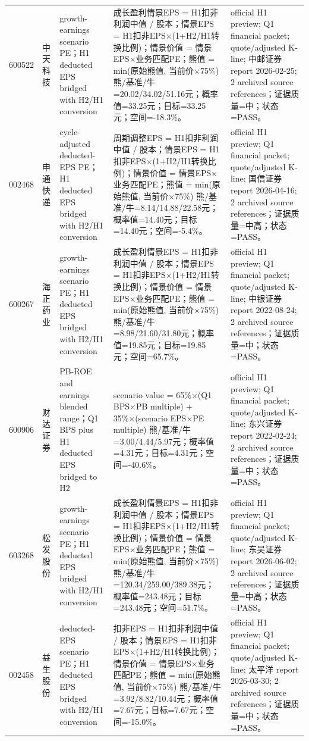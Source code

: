 \begin{longtable}{L{0.85cm}L{1.55cm}L{2.25cm}L{6.0cm}L{4.0cm}}
600522 & 中天科技 & growth-earnings scenario PE；H1 deducted EPS bridged with H2/H1 conversion & 成长盈利情景EPS = H1扣非利润中值 / 股本；情景EPS = H1扣非EPS×(1+H2/H1转换比例)；情景价值 = 情景EPS×业务匹配PE；熊值 = min(原始熊值, 当前价×75\%) 熊/基准/牛=20.02/34.02/51.16元；概率值=33.25元；目标=33.25元；空间=-18.3\%。 & official H1 preview; Q1 financial packet; quote/adjusted K-line; 中邮证券 report 2026-02-25; 2 archived source references；证据质量=中；状态=PASS。 \\
002468 & 申通快递 & cycle-adjusted deducted-EPS PE；H1 deducted EPS bridged with H2/H1 conversion & 周期调整EPS = H1扣非利润中值 / 股本；情景EPS = H1扣非EPS×(1+H2/H1转换比例)；情景价值 = 情景EPS×业务匹配PE；熊值 = min(原始熊值, 当前价×75\%) 熊/基准/牛=8.14/14.88/22.58元；概率值=14.40元；目标=14.40元；空间=-5.4\%。 & official H1 preview; Q1 financial packet; quote/adjusted K-line; 国信证券 report 2026-04-16; 2 archived source references；证据质量=中高；状态=PASS。 \\
600267 & 海正药业 & growth-earnings scenario PE；H1 deducted EPS bridged with H2/H1 conversion & 成长盈利情景EPS = H1扣非利润中值 / 股本；情景EPS = H1扣非EPS×(1+H2/H1转换比例)；情景价值 = 情景EPS×业务匹配PE；熊值 = min(原始熊值, 当前价×75\%) 熊/基准/牛=8.98/21.60/31.80元；概率值=19.85元；目标=19.85元；空间=65.7\%。 & official H1 preview; Q1 financial packet; quote/adjusted K-line; 中银证券 report 2022-08-24; 2 archived source references；证据质量=中；状态=PASS。 \\
600906 & 财达证券 & PB-ROE and earnings blended range；Q1 BPS plus H1 deducted EPS bridged to H2 & scenario value = 65\%×(Q1 BPS×PB multiple) + 35\%×(scenario EPS×PE multiple) 熊/基准/牛=3.00/4.44/5.97元；概率值=4.31元；目标=4.31元；空间=-40.6\%。 & official H1 preview; Q1 financial packet; quote/adjusted K-line; 东兴证券 report 2022-02-24; 2 archived source references；证据质量=中；状态=PASS。 \\
603268 & 松发股份 & growth-earnings scenario PE；H1 deducted EPS bridged with H2/H1 conversion & 成长盈利情景EPS = H1扣非利润中值 / 股本；情景EPS = H1扣非EPS×(1+H2/H1转换比例)；情景价值 = 情景EPS×业务匹配PE；熊值 = min(原始熊值, 当前价×75\%) 熊/基准/牛=120.34/259.00/389.38元；概率值=243.48元；目标=243.48元；空间=51.7\%。 & official H1 preview; Q1 financial packet; quote/adjusted K-line; 东吴证券 report 2026-06-02; 2 archived source references；证据质量=中高；状态=PASS。 \\
002458 & 益生股份 & deducted-EPS scenario PE；H1 deducted EPS bridged with H2/H1 conversion & 扣非EPS = H1扣非利润中值 / 股本；情景EPS = H1扣非EPS×(1+H2/H1转换比例)；情景价值 = 情景EPS×业务匹配PE；熊值 = min(原始熊值, 当前价×75\%) 熊/基准/牛=3.92/8.82/10.44元；概率值=7.67元；目标=7.67元；空间=-15.0\%。 & official H1 preview; Q1 financial packet; quote/adjusted K-line; 太平洋 report 2026-03-30; 2 archived source references；证据质量=中；状态=PASS。 \\

\end{longtable}
